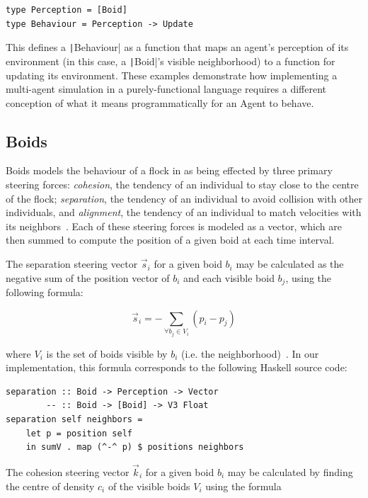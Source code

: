 \begin{verbatim}
type Perception = [Boid]
type Behaviour = Perception -> Update
\end{verbatim}

This defines a \texttt|Behaviour| as a function that maps an agent's perception of its environment (in this case, a \texttt|Boid|'s visible neighborhood) to
a function for updating its environment. These examples demonstrate how implementing a multi-agent
simulation in a purely-functional language requires a different conception of
what it means programmatically for an Agent to behave. 

\subsection{Boids}\label{boids}

Boids models the behaviour of a flock in as being effected by three primary steering forces: \textit{cohesion}, the tendency of an individual to stay close to the centre of the flock; \textit{separation}, the tendency of an individual to avoid collision with other individuals, and \textit{alignment}, the tendency of an individual to match velocities with its neighbors~\cite{hartman2006autonomous,reynolds1987flocks}. Each of these steering forces is modeled as a vector, which are then summed to compute the position of a given boid at each time interval.

The separation steering vector $\vec{s}_i$ for a given boid $b_i$ may be calculated as the negative sum of the position vector of $b_i$ and each visible boid $b_j$, using the following formula:

\[ \vec{s}_i = - \sum\limits_{\forall b_j \in V_i} (p_i - p_j) \]

where $V_i$ is the set of boids visible by $b_i$ (i.e. the neighborhood)~\cite{hartman2006autonomous}. In our implementation, this formula corresponds to the following Haskell source code:

\begin{verbatim}
separation :: Boid -> Perception -> Vector
        -- :: Boid -> [Boid] -> V3 Float
separation self neighbors =
    let p = position self
    in sumV . map (^-^ p) $ positions neighbors
\end{verbatim}

The cohesion steering vector $\vec{k}_i$ for a given boid $b_i$ may be calculated by finding the centre of density $c_i$ of the visible boids $V_i$ using the formula

